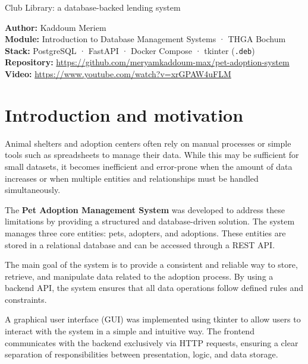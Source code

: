 \documentclass[11pt,a4paper]{article}
\begin{document}
\thispagestyle{empty}
%
{Club Library: a database-backed lending system}

\begin{infobox}
\textbf{Author:} Kaddoum Meriem \\
\textbf{Module:} Introduction to Database Management Systems · THGA Bochum \\
\textbf{Stack:} PostgreSQL · FastAPI · Docker Compose · tkinter (\texttt{.deb}) \\
\textbf{Repository:} \url{https://github.com/meryamkaddoum-max/pet-adoption-system}
\textbf{Video:} \url{https://www.youtube.com/watch?v=xrGPAW4uFLM}
\end{infobox}

\tableofcontents
\vspace{1em}

\section{Introduction and motivation}


Animal shelters and adoption centers often rely on manual processes or simple tools
such as spreadsheets to manage their data. While this may be sufficient for small
datasets, it becomes inefficient and error-prone when the amount of data increases
or when multiple entities and relationships must be handled simultaneously.

The \textbf{Pet Adoption Management System} was developed to address these limitations
by providing a structured and database-driven solution. The system manages three
core entities: pets, adopters, and adoptions. These entities are stored in a relational
database and can be accessed through a REST API.

The main goal of the system is to provide a consistent and reliable way to store,
retrieve, and manipulate data related to the adoption process. By using a backend
API, the system ensures that all data operations follow defined rules and constraints.

A graphical user interface (GUI) was implemented using tkinter to allow users to
interact with the system in a simple and intuitive way. The frontend communicates
with the backend exclusively via HTTP requests, ensuring a clear separation of
responsibilities between presentation, logic, and data storage.
\end{document}
